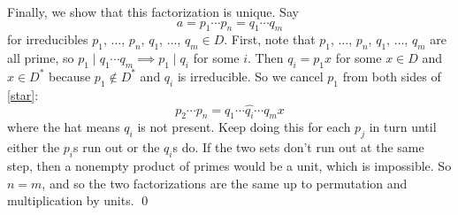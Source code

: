 Finally, we show that this factorization is unique.  Say
\[ a = p_1\dotsm p_n = q_1\dotsm q_m \tag{$*$}\label{star} \]
for irreducibles $p_1$, $\dotsc$, $p_n$, $q_1$, $\dotsc$, $q_m\in D$.  First, note that $p_1$, $\dotsc$, $p_n$, $q_1$, $\dotsc$, $q_m$ are all prime, so $p_1\mid q_1\dotsm q_m\implies p_1\mid q_i$ for some $i$.  Then $q_i=p_1x$ for some $x\in D$ and $x\in D^*$ because $p_1\notin D^*$ and $q_i$ is irreducible.  So we cancel $p_1$ from both sides of \eqref{star}:
\[ p_2\dotsm p_n = q_1 \dotsm \hat{q_i} \dotsm q_m x \]
where the hat means $q_i$ is not present.  Keep doing this for each $p_j$ in turn until either the $p_i$s run out or the $q_i$s do.  If the two sets don't run out at the same step, then a nonempty product of primes would be a unit, which is impossible.  So $n=m$, and so the two factorizations are the same up to permutation and multiplication by units. \qed
